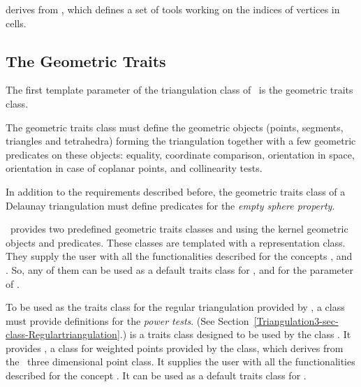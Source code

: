  derives from
, 
which defines a set of tools
working on the indices of vertices in cells. 

\subsection{The Geometric Traits}
\label{Triangulation3-sec-Traits}

The first template parameter of the triangulation class
 of \cgal\ is the geometric traits class.

The geometric traits class must define the geometric
objects (points, segments, triangles and tetrahedra) forming the
triangulation together with a few geometric predicates on these objects:
equality, coordinate comparison, orientation in space, orientation
in case of coplanar points, and collinearity tests.

In addition to the requirements described before, the geometric traits
class of a Delaunay triangulation must define predicates for the
\textit{empty sphere property}.

\cgal\ provides two predefined geometric traits classes
 and  using the kernel
geometric objects and predicates.
These classes are templated with a representation class.
They supply the user with all
the functionalities described for the concepts
,
 and
.
So, any of them can be used as a default traits
class for ,
and for the parameter  of .

To be used as the traits class for the regular triangulation provided
by \cgal, a class must provide definitions for the \textit{power tests}.
(See Section~\ref{Triangulation3-sec-class-Regulartriangulation}.)
 is a traits class 
 designed to be used by the class
. It provides
, a class for weighted points
provided by the class, which derives from the \cgal\ three dimensional
point class. It supplies
the user with all the functionalities 
described for the concept . 
 It can be used as a default traits
class for .

